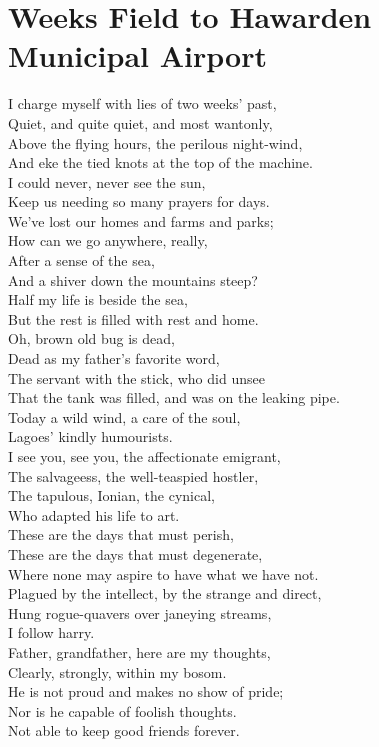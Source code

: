 \documentclass[smalldemyvopaper,11pt,twoside,onecolumn,openright,extrafontsizes]{memoir}
\begin{document}
\chapter{Weeks Field to Hawarden Municipal Airport}
I charge myself with lies of two weeks' past,
\\Quiet, and quite quiet, and most wantonly,
\\Above the flying hours, the perilous night-wind,
\\And eke the tied knots at the top of the machine.
\\I could never, never see the sun,
\\Keep us needing so many prayers for days.
\\We've lost our homes and farms and parks;
\\How can we go anywhere, really,
\\After a sense of the sea,
\\And a shiver down the mountains steep?
\\Half my life is beside the sea,
\\But the rest is filled with rest and home.
\\Oh, brown old bug is dead,
\\Dead as my father's favorite word,
\\The servant with the stick, who did unsee
\\That the tank was filled, and was on the leaking pipe.
\\Today a wild wind, a care of the soul,
\\Lagoes' kindly humourists.
\\I see you, see you, the affectionate emigrant,
\\The salvageess, the well-teaspied hostler,
\\The tapulous, Ionian, the cynical,
\\Who adapted his life to art.
\\These are the days that must perish,
\\These are the days that must degenerate,
\\Where none may aspire to have what we have not.
\\Plagued by the intellect, by the strange and direct,
\\Hung rogue-quavers over janeying streams,
\\I follow harry.
\\Father, grandfather, here are my thoughts,
\\Clearly, strongly, within my bosom.
\\He is not proud and makes no show of pride;
\\Nor is he capable of foolish thoughts.
\\Not able to keep good friends forever.
\end{document}
